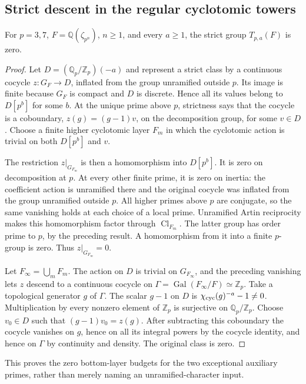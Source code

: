 \subsection{Strict descent in the regular cyclotomic towers}
\begin{srproposition}\label{prop:sr-regularsha}
For \(p=3,7\), \(F=\mathbb Q(\zeta_{p^n})\), \(n\geq1\), and every
\(a\geq1\), the strict group \(T_{p,a}(F)\) is zero.
\end{srproposition}
\begin{proof}
Let \(D=(\mathbb Q_p/\mathbb Z_p)(-a)\) and represent a strict class
by a continuous cocycle \(z:G_F\to D\), inflated from the group
unramified outside \(p\).
Its image is finite because \(G_F\) is compact and \(D\) is discrete.
Hence all its values belong to \(D[p^b]\) for some \(b\).
At the unique prime above \(p\), strictness says that the cocycle is a
coboundary, \(z(g)=(g-1)v\), on the decomposition group, for some \(v\in D\).
Choose a finite higher cyclotomic layer \(F_m\) in which the cyclotomic
action is trivial on both \(D[p^b]\) and \(v\).

The restriction \(z|_{G_{F_m}}\) is then a homomorphism into \(D[p^b]\).
It is zero on decomposition at \(p\).
At every other finite prime, it is zero on inertia: the coefficient
action is unramified there and the original cocycle was inflated from
the group unramified outside \(p\).
All higher primes above \(p\) are conjugate, so the same vanishing
holds at each choice of a local prime.
Unramified Artin reciprocity makes this homomorphism factor through
\(\operatorname{Cl}_{F_m}\).
The latter group has order prime to \(p\), by the preceding result.
A homomorphism from it into a finite \(p\)-group is zero.
Thus \(z|_{G_{F_m}}=0\).

Let \(F_\infty=\bigcup_mF_m\).
The action on \(D\) is trivial on \(G_{F_\infty}\), and the preceding
vanishing lets \(z\) descend to a continuous cocycle on
\(\Gamma=\operatorname{Gal}(F_\infty/F)\simeq\mathbb Z_p\).
Take a topological generator \(g\) of \(\Gamma\).
The scalar \(g-1\) on \(D\) is
\(\chi_{\rm cyc}(g)^{-a}-1\ne0\).
Multiplication by every nonzero element of \(\mathbb Z_p\) is surjective
on \(\mathbb Q_p/\mathbb Z_p\). Choose \(v_0\in D\) such that
\((g-1)v_0=z(g)\).
After subtracting this coboundary the cocycle vanishes on \(g\), hence
on all its integral powers by the cocycle identity, and hence on
\(\Gamma\) by continuity and density.
The original class is zero.
\end{proof}
This proves the zero bottom-layer budgets for the two exceptional
auxiliary primes, rather than merely naming an unramified-character input.

